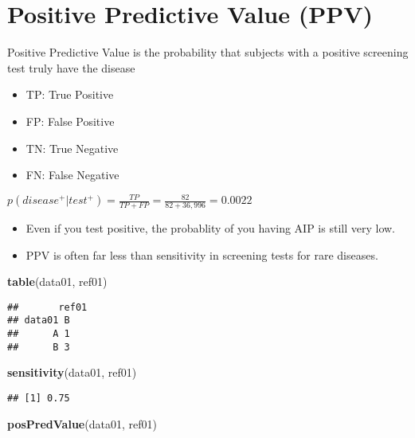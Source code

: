 \documentclass[
]{article}
\newenvironment{Shaded}{\begin{snugshade}}{\end{snugshade}}
\newcommand{\KeywordTok}[1]{\textcolor[rgb]{0.13,0.29,0.53}{\textbf{#1}}}
\newcommand{\NormalTok}[1]{#1}
\providecommand{\tightlist}{%
  \setlength{\itemsep}{0pt}\setlength{\parskip}{0pt}}
\begin{document}
\hypertarget{positive-predictive-value-ppv}{%
\section{Positive Predictive Value
(PPV)}\label{positive-predictive-value-ppv}}

Positive Predictive Value is the probability that subjects with a
positive screening test truly have the disease

\begin{itemize}
\tightlist
\item
  TP: True Positive
\item
  FP: False Positive
\item
  TN: True Negative
\item
  FN: False Negative
\end{itemize}

\(p(disease^+|test^+) = \frac{TP}{TP+FP}=\frac{82}{82+36,996}=0.0022\)

\begin{itemize}
\tightlist
\item
  Even if you test positive, the probablity of you having AIP is still
  very low.
\item
  PPV is often far less than sensitivity in screening tests for rare
  diseases.
\end{itemize}

\begin{Shaded}
\begin{Highlighting}[]
\KeywordTok{table}\NormalTok{(data01, ref01)}
\end{Highlighting}
\end{Shaded}

\begin{verbatim}
##       ref01
## data01 B
##      A 1
##      B 3
\end{verbatim}

\begin{Shaded}
\begin{Highlighting}[]
\KeywordTok{sensitivity}\NormalTok{(data01, ref01) }
\end{Highlighting}
\end{Shaded}

\begin{verbatim}
## [1] 0.75
\end{verbatim}

\begin{Shaded}
\begin{Highlighting}[]
\KeywordTok{posPredValue}\NormalTok{(data01, ref01) }
\end{Highlighting}
\end{Shaded}
\end{document}
